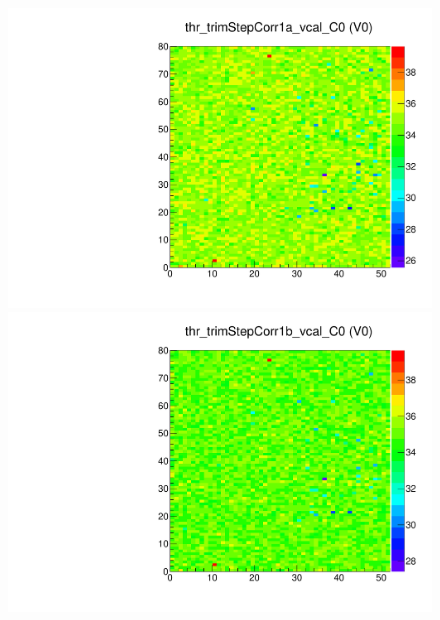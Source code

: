 \begin{figure}[!Hp]
\centering
\begin{minipage}{0.45\textwidth}
  \includegraphics[width=1.0\textwidth]{figures/trim_thr_trimStepCorr1a_vcal.pdf}
  \caption{}
  \label{fig:trim_thr_trimStepCorr1a_vcal}
\end{minipage}
\hspace{0.3cm}
\begin{minipage}{0.45\textwidth}
  \includegraphics[width=1.0\textwidth]{figures/trim_thr_trimStepCorr1b_vcal.pdf}
  \caption{}
  \label{fig:trim_thr_trimStepCorr1b_vcal}
\end{minipage}
\end{figure}



